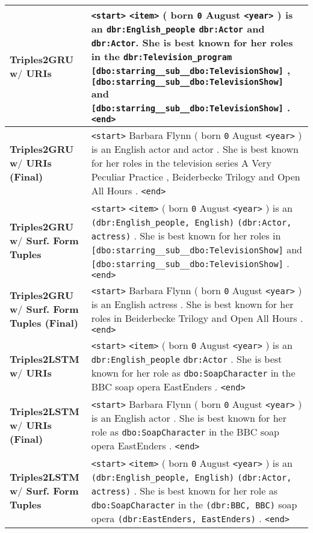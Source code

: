 \documentclass[preprint,5p]{elsarticle}
\begin{document}
\begin{table*}[h!]
\begin{center}
\begin{tabular}{|L{3.5cm}|L{14cm}|}
      \textbf{Triples2GRU w$/$ URIs} & \texttt{<start>} \texttt{<item>} ( born \texttt{0} August \texttt{<year>} ) is an \texttt{dbr:English\_people} \texttt{dbr:Actor} and \texttt{dbr:Actor}. She is best known for her roles in the \texttt{dbr:Television\_program} \texttt{[dbo:starring\_\_sub\_\_dbo:TelevisionShow]} , \texttt{[dbo:starring\_\_sub\_\_dbo:TelevisionShow]} and \texttt{[dbo:starring\_\_sub\_\_dbo:TelevisionShow]} . \texttt{<end>}\\ \hline
      
      \textbf{Triples2GRU w$/$ URIs (Final)} & \texttt{<start>} Barbara Flynn ( born \texttt{0} August \texttt{<year>} ) is an English actor and actor . She is best known for her roles in the television series A Very Peculiar Practice , Beiderbecke Trilogy and Open All Hours . \texttt{<end>} \\ \hline
      
      \textbf{Triples2GRU w$/$ Surf. Form Tuples} & \texttt{<start>} \texttt{<item>} ( born \texttt{0} August \texttt{<year>} ) is an \texttt{(dbr:English\_people, English)} \texttt{(dbr:Actor, actress)} . She is best known for her roles in \texttt{[dbo:starring\_\_sub\_\_dbo:TelevisionShow]} and \texttt{[dbo:starring\_\_sub\_\_dbo:TelevisionShow]} . \texttt{<end>} \\ \hline
      
      \textbf{Triples2GRU w$/$ Surf. Form Tuples (Final)} & \texttt{<start>} Barbara Flynn ( born \texttt{0} August \texttt{<year>} ) is an English actress . She is best known for her roles in Beiderbecke Trilogy and Open All Hours . \texttt{<end>} \\ \hline
      




      \textbf{Triples2LSTM w$/$ URIs} & \texttt{<start>} \texttt{<item>} ( born \texttt{0} August \texttt{<year>} ) is an \texttt{dbr:English\_people} \texttt{dbr:Actor} . She is best known for her role as \texttt{dbo:SoapCharacter} in the BBC soap opera EastEnders . \texttt{<end>} \\ \hline
      
      \textbf{Triples2LSTM w$/$ URIs (Final)} & \texttt{<start>} Barbara Flynn ( born \texttt{0} August \texttt{<year>} ) is an English actor .  She is best known for her role as \texttt{dbo:SoapCharacter} in the BBC soap opera EastEnders . \texttt{<end>} \\ \hline
      
      \textbf{Triples2LSTM w$/$ Surf. Form Tuples} & \texttt{<start>} \texttt{<item>} ( born \texttt{0} August \texttt{<year>} ) is an \texttt{(dbr:English\_people, English)} \texttt{(dbr:Actor, actress)} .  She is best known for her role as \texttt{dbo:SoapCharacter} in the \texttt{(dbr:BBC, BBC)} soap opera \texttt{(dbr:EastEnders, EastEnders)} . \texttt{<end>} \\ \hline
      

\end{tabular}
\end{center}
\end{table*}
\end{document}
